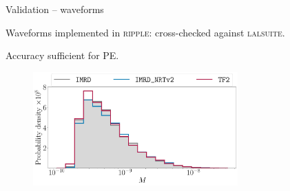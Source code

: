 \documentclass[usenames,dvipsnames,t]{beamer}
\begin{document}
\begin{frame}{Validation -- waveforms}

Waveforms implemented in \textsc{ripple}: cross-checked against \textsc{lalsuite}.

Accuracy sufficient for PE. 

\vspace{3mm}

\begin{figure}
  \centering
  \includegraphics[width=0.7\textwidth]{Figures/mismatch_histogram.pdf}
\end{figure}

\end{frame}
\end{document}
